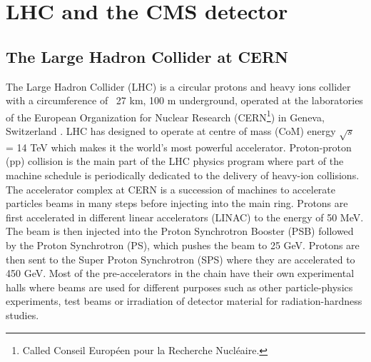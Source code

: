 \graphicspath{{chapt_dutch/}{intro/}{chapt2/}{chapt3/}{chapt4/}{chapt5/}{chapt6/}{chapt7/}{chapt8/}}

\renewcommand\evenpagerightmark{{\scshape\small Chapter 3}}
\renewcommand\oddpageleftmark{{\scshape\small LHC and the CMS Experiment}}

\renewcommand{\bibname}{References}

\hyphenation{}

\chapter[LHC and the CMS Experiment]%
{LHC and the CMS detector}
\label{chap:2}

\section{The Large Hadron Collider at CERN}
\label{sec:lhc}
The Large Hadron Collider (LHC) is a circular protons and heavy ions collider with a circumference of ~27 km, 100 m underground, operated at the laboratories of the European Organization for Nuclear Research (CERN\footnote{Called Conseil Européen pour la Recherche Nucléaire.}) in Geneva, Switzerland \cite{Bruning:lhc}. LHC has designed to operate at centre of mass (CoM) energy $\sqrt{s}$ = 14 TeV which makes it the world's most powerful accelerator. Proton-proton (pp) collision is the main part of the LHC physics program where part of the machine schedule is periodically dedicated to the delivery of heavy-ion collisions. The accelerator complex at CERN is a succession of machines to accelerate particles beams in many steps before injecting into the main ring. Protons are first accelerated in different linear accelerators (LINAC) to the energy of 50 MeV. The beam is then injected into the Proton Synchrotron Booster (PSB) followed by the Proton Synchrotron (PS), which pushes the beam to 25 GeV. Protons are then sent to the Super Proton Synchrotron (SPS) where they are accelerated to 450 GeV. Most of the pre-accelerators in the chain have their own experimental halls where beams are used for different purposes such as other particle-physics experiments, test beams or irradiation of detector material for radiation-hardness studies.\\
